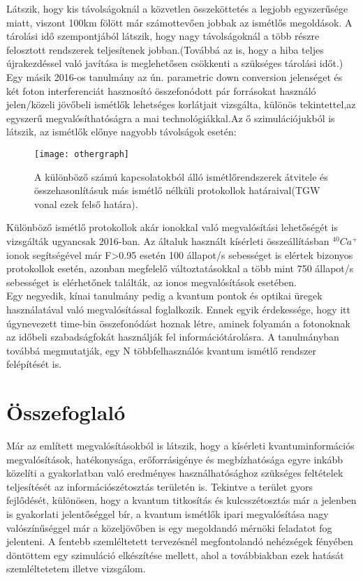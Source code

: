 Látszik, hogy kis távolságoknál a közvetlen összeköttetés a legjobb egyszerűsége miatt, viszont 100km fölött már számottevően jobbak az ismétlős megoldások. A tárolási idő szempontjából látszik, hogy nagy távolságoknál a több részre felosztott rendszerek teljesítenek jobban.(Továbbá az is, hogy a hiba teljes újrakezdéssel való javítása is meglehetősen csökkenti a szükséges tárolási időt.)\\
Egy másik 2016-os tanulmány\cite{krovi2016practical} az ún. parametric down conversion jelenséget és két foton interferenciát hasznosító  összefonódott pár forrásokat használó jelen/közeli jövőbeli ismétlők lehetséges korlátjait vizsgálta, különös tekintettel,az egyszerű megvalósíthatóságra a mai technológiákkal.Az ő szimulációjukból is látszik, az ismétlők előnye nagyobb távolságok esetén:\\
\begin{figure}[H]
\centering
\texttt{[image: othergraph]}
\caption[Ismétlő teljesítményhatár]{A különböző számú kapcsolatokból álló ismétlőrendszerek átvitele és összehasonlításuk más ismétlő nélküli protokollok határaival(TGW vonal ezek felső határa).
}
\end{figure}
Különböző ismétlő protokollok akár ionokkal való megvalósítási lehetőségét is vizsgálták\cite{pfister2016quantum} ugyancsak 2016-ban. Az általuk használt kísérleti összeállításban $^{40}Ca^+$ ionok segítségével már F>0.95 esetén 100 állapot/s sebességet is elértek bizonyos protokollok esetén, azonban megfelelő változtatásokkal a több mint 750 állapot/s sebességet is elérhetőnek találták, az ionos megvalósítások esetében.\\

Egy negyedik, kínai tanulmány\cite{li2016heralded} pedig a kvantum pontok és optikai üregek használatával való megvalósítással foglalkozik. Ennek egyik érdekessége, hogy itt úgynevezett time-bin összefonódást hoznak létre, aminek folyamán a fotonoknak az időbeli szabadságfokát használják fel információtárolásra. 
A tanulmányban továbbá megmutatják, egy N többfelhasználós kvantum ismétlő rendszer felépítését is.

\section{Összefoglaló}

Már az említett megvalósításokból is látszik, hogy a kísérleti kvantuminformációs megvalósítások, hatékonysága, erőforrásigénye és megbízhatósága egyre inkább közelíti a gyakorlatban való eredményes használhatósághoz szükséges feltételek teljesítését az információszétosztás területén is. Tekintve a terület gyors fejlődését, különösen, hogy a kvantum titkosítás és kulcsszétosztás már a jelenben is gyakorlati jelentőséggel bír, a kvantum ismétlők ipari megvalósítása nagy valószínűséggel már a közeljövőben is egy megoldandó mérnöki feladatot fog jelenteni. A fentebb szemléltetett tervezésnél megfontolandó nehézségek fényében döntöttem egy szimuláció elkészítése mellett, ahol a továbbiakban ezek hatását szemléltetetem illetve vizsgálom.
